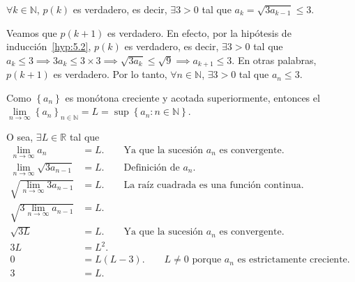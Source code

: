 \begin{frame}
\begin{solution}
\begin{description}[leftmargin=*]
\begin{enumerate}[(1)]
                    $\forall k\in\mathbb{N}$, $p\left(k\right)$ es
                    verdadero, es decir, $\exists 3>0$ tal que
                    $a_{k}=\sqrt{3a_{k-1}}\leq 3$.
                \end{enumerate}

                Veamos que $p\left(k+1\right)$ es verdadero.
                En efecto, por la hipótesis de
                inducción~\eqref{hyp:5.2}, $p\left(k\right)$ es
                verdadero, es decir, $\exists 3>0$ tal que
                \begin{math}
                    a_{k}\leq 3\implies
                    3a_{k}\leq 3\times 3\implies
                    \sqrt{3a_{k}}\leq\sqrt{9}\implies
                    a_{k+1}\leq3
                \end{math}.
                En otras palabras, $p\left(k+1\right)$ es verdadero.
                Por lo tanto, $\forall n\in\mathbb{N}$, $\exists 3>0$
                tal que $a_{n}\leq 3$.
        \end{description}
    \end{solution}
\end{frame}

\begin{frame}
    Como $\left\{a_{n}\right\}$ es monótona creciente y acotada
    superiormente, entonces el
    \begin{math}
        \lim\limits_{n\to\infty}
        \left\{a_{n}\right\}_{n\in\mathbb{N}}=
        L=
        \sup\left\{a_{n}:n\in\mathbb{N}\right\}
    \end{math}.

    O sea, $\exists L\in\mathbb{R}$ tal que
    \begin{align*}
        \lim\limits_{n\to\infty}a_{n}
         & =
        L.                 \qquad\text{Ya que la sucesión $a_{n}$ es convergente.}
         &   \\
        \lim\limits_{n\to\infty}\sqrt{3a_{n-1}}
         & =
        L.                 \qquad\text{Definición de $a_{n}$.}
         &   \\
        \sqrt{\lim\limits_{n\to\infty}3a_{n-1}}
         & =
        L.                 \qquad\text{La raíz cuadrada es una función continua.}
         &   \\
        \sqrt{3\lim\limits_{n\to\infty}a_{n-1}}
         & =
        L.
         &   \\
        \sqrt{3L}
         & =
        L.              \qquad\text{Ya que la sucesión $a_{n}$ es convergente.}
         &   \\
        3L
         & =
        L^{2}.
         &   \\
        0
         & =
        L\left(L-3\right). \qquad\text{$L\neq0$ porque $a_{n}$ es estrictamente creciente.}
         &   \\
        3
         & =
        L.
    \end{align*}
\end{frame}

